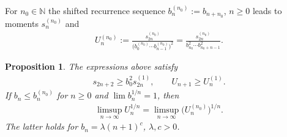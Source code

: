 \documentclass[pdftex]{sigma}
\numberwithin{equation}{section}
\newtheorem{prop}[thm]{Proposition}
\begin{document}
For $n_0\in\mathbb N$ the shifted recurrence sequence $b_n^{(n_0)}:=b_{n+n_0}$, $n\ge 0$ leads to moments $s_n^{(n_0)}$ and
\begin{gather*}
U_n^{(n_0)}:=\frac{s_{2n}^{(n_0)}}{\big(b_0^{(n_0)}\cdots b_{n-1}^{(n_0)}\big)^2}=\frac{s_{2n}^{(n_0)}}{b_{n_0}^2\cdots b_{n_0+n-1}^2}.
\end{gather*}

\begin{prop}\label{thm:shiftU} The expressions above satisfy
\begin{gather}\label{eq:shiftU1}
s_{2n+2}\ge b_0^2 s_{2n}^{(1)},\qquad U_{n+1}\ge U_n^{(1)}.
\end{gather}
If $b_n\le b_n^{(n_0)}$ for $n\ge 0$ and $\lim b_n^{1/n}=1$, then
\begin{gather}\label{eq:shiftU2}
\limsup_{n\to\infty} U_n^{1/n}=\limsup_{n\to\infty}\big(U_n^{(n_0)}\big)^{1/n}.
\end{gather}
The latter holds for $b_n=\lambda (n+1)^c$, $\lambda, c>0$.
\end{prop}
\end{document}
